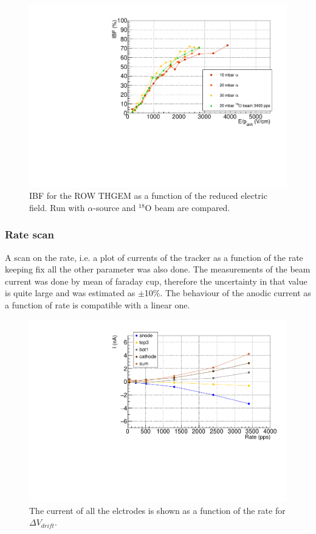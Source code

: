 \documentclass[a4paper, 11 pt]{report}
\newcommand{\Vdrift}{$ \Delta V_{drift}$}
\begin{document}
  \begin{figure}[htbp]
	\centering
	\includegraphics[width=\textwidth]{Immagini/IBF_ROW_Comparison_F.pdf}
	\caption{IBF for the ROW THGEM as a function of the reduced electric field. Run with 
	$\alpha$-source	and $^{18}$O beam are compared.}
	\label{fig:IBF_ROW_beam_F}
  \end{figure}

\clearpage
  \subsubsection{Rate scan}  

  A scan on the rate, i.e. a plot of currents of the tracker as a function of the 
  rate keeping fix all the other parameter was also done.
  The measurements of the beam current was done by mean of faraday cup, therefore
  the uncertainty in that value is quite large and was estimated as $\pm$10\%.
  The behaviour of the anodic current as a function of rate is compatible with
  a linear one.

  \begin{figure}[htbp]
	\centering
	\includegraphics[width=\textwidth]{Immagini/Rate_ROW_1000V.pdf}
	\caption{The current of all the elctrodes is shown as a function of the rate 
	for \Vdrift.}
	\label{fig:Rate_allcurrent_ROW}
  \end{figure}
  
\end{document}
